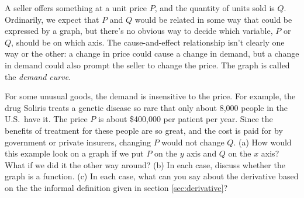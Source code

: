 A seller offers something at a unit price $P$, and the quantity of units
sold is $Q$. Ordinarily, we expect that $P$ and $Q$ would be related in some
way that could be expressed by a graph, but there's no obvious way to decide
which variable, $P$ or $Q$, should be on which axis. The cause-and-effect relationship
isn't clearly one way or the other: a change in price could cause a change in demand,
but a change in demand could also prompt the seller to change the price. 
The graph is called the \emph{demand curve}.

For some
unusual goods, the demand is insensitive to the price. For example, the drug
Soliris treats a genetic disease so rare that only about 8,000 people in the U.S.~have it.
The price $P$ is about \$400,000 per patient per year. Since the benefits
of treatment for these people are so great, and the cost is paid for by government
or private insurers, changing $P$ would not change $Q$. (a) How would this example look
on a graph if we put $P$ on the $y$ axis and $Q$ on the $x$ axis? What if we did
it the other way around? (b) In each case, discuss whether the graph is a function.
(c) In each case, what can you say about
the derivative based on the
the informal definition given in section
\ref{sec:derivative}?
